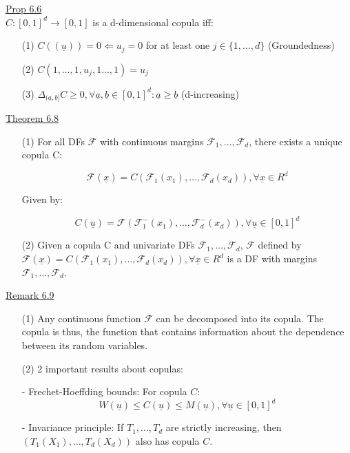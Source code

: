 \documentclass[10pt,letterpaper]{article}
\begin{document}
\underline{Prop 6.6}\\

$C:[0,1]^d\rightarrow [0,1]$ is a d-dimensional copula iff:

\begin{enumerate}

\item[(1)] $C((\underline{u}))=0\Longleftarrow u_j=0$ for at least one $j\in\{1,\dots,d\}$ (Groundedness)

\item[(2)] $C(1,\dots,1,u_j,1\dots,1)=u_j$

\item[(3)] $\Delta_{(\underline{a},\underline{b}]}C\geq 0,\forall\underline{a},\underline{b}\in[0,1]^d:\underline{a}\geq\underline{b}$ (d-increasing)

\end{enumerate}

\pagebreak

\underline{Theorem 6.8}\\

\begin{enumerate}

\item[(1)] For all DFs $\mathcal{F}$ with continuous margins $\mathcal{F}_1,\dots,\mathcal{F}_d$, there exists a unique copula C:

$$\mathcal{F}(\underline{x})=C(\mathcal{F}_1(x_1),\dots,\mathcal{F}_d(x_d)), \forall\underline{x}\in R^d$$

Given by:

$$C(\underline{u})=\mathcal{F}(\mathcal{F}_1^-(x_1),\dots,\mathcal{F}_d^-(x_d)), \forall\underline{u}\in [0,1]^d$$

\item[(2)] Given a copula C and univariate DFs $\mathcal{F}_1,\dots,\mathcal{F}_d$, $\mathcal{F}$ defined by $\mathcal{F}(\underline{x})=C(\mathcal{F}_1(x_1),\dots,\mathcal{F}_d(x_d)), \forall\underline{x}\in R^d$ is a DF with margins $\mathcal{F}_1,\dots,\mathcal{F}_d$.

\end{enumerate}

\underline{Remark 6.9}\\

\begin{enumerate}

\item[(1)] Any continuous function $\mathcal{F}$ can be decomposed into its copula. The copula is thus, the function that contains information about the dependence between its random variables.

\item[(2)] 2 important results about copulas:
\item[-] Frechet-Hoeffding bounds: For copula $C$:
$$W(\underline{u})\leq C(\underline{u})\leq M(\underline{u}), \forall\underline{u}\in[0,1]^d$$
\item[-] Invariance principle: If $T_1,\dots,T_d$ are strictly increasing, then $(T_1(X_1),\dots,T_d(X_d))$ also has copula $C$.

\end{enumerate}
\end{document}
